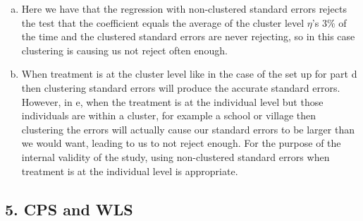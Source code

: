\documentclass[11pt]{article}
\begin{document}
\begin{enumerate}[a)]
	\item Here we have that the regression with non-clustered standard errors rejects the test that the coefficient equals the average of the cluster level $\eta$'s 3\% of the time and the clustered standard errors are never rejecting, so in this case clustering is causing us not reject often enough. \\
		
	\item When treatment is at the cluster level like in the case of the set up for part d then clustering standard errors will produce the accurate standard errors. However, in e, when the treatment is at the individual level but those individuals are within a cluster, for example a school or village then clustering the errors will actually cause our standard errors to be larger than we would want, leading to us to not reject enough. For the purpose of the internal validity of the study, using non-clustered standard errors when treatment is at the individual level is appropriate. 
\end{enumerate}


\newpage
\subsection*{5. CPS and WLS}
\end{document}

